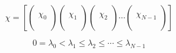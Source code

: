 \begin{equation}
\chi = 
\left[
\begin{pmatrix}\\\chi_0\\\\\end{pmatrix}
\begin{pmatrix}\\\chi_1\\\\\end{pmatrix}
\begin{pmatrix}\\\chi_2\\\\\end{pmatrix}
\cdots
\begin{pmatrix}\\\chi_{N-1}\\\\\end{pmatrix}
\right]
\end{equation}

\begin{equation}
0 = \lambda_0 < \lambda_1 \le \lambda_2 \le \cdots \le \lambda_{N-1}
\end{equation}
